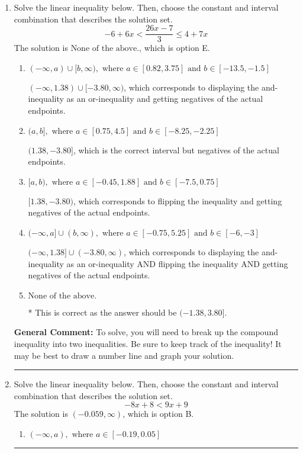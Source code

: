 \documentclass{extbook}[14pt]
\newcommand{\litem}[1]{\item #1

\rule{\textwidth}{0.4pt}}
\begin{document}
\begin{enumerate}
{\begin{enumerate}[label=\Alph*.]
 $(-\infty, -0.429)$, which corresponds to switching the direction of the interval. You likely did this if you did not flip the inequality when dividing by a negative!
\item \( \text{None of the above}. \)

You may have chosen this if you thought the inequality did not match the ends of the intervals.
\end{enumerate}

\textbf{General Comment:} Remember that less/greater than or equal to includes the endpoint, while less/greater do not. Also, remember that you need to flip the inequality when you multiply or divide by a negative.
}
\litem{
Solve the linear inequality below. Then, choose the constant and interval combination that describes the solution set.
\[ -6 + 6 x < \frac{26 x - 7}{3} \leq 4 + 7 x \]The solution is \( \text{None of the above.} \), which is option E.\begin{enumerate}[label=\Alph*.]
\item \( (-\infty, a) \cup [b, \infty), \text{ where } a \in [0.82, 3.75] \text{ and } b \in [-13.5, -1.5] \)

$(-\infty, 1.38) \cup [-3.80, \infty)$, which corresponds to displaying the and-inequality as an or-inequality and getting negatives of the actual endpoints.
\item \( (a, b], \text{ where } a \in [0.75, 4.5] \text{ and } b \in [-8.25, -2.25] \)

$(1.38, -3.80]$, which is the correct interval but negatives of the actual endpoints.
\item \( [a, b), \text{ where } a \in [-0.45, 1.88] \text{ and } b \in [-7.5, 0.75] \)

$[1.38, -3.80)$, which corresponds to flipping the inequality and getting negatives of the actual endpoints.
\item \( (-\infty, a] \cup (b, \infty), \text{ where } a \in [-0.75, 5.25] \text{ and } b \in [-6, -3] \)

$(-\infty, 1.38] \cup (-3.80, \infty)$, which corresponds to displaying the and-inequality as an or-inequality AND flipping the inequality AND getting negatives of the actual endpoints.
\item \( \text{None of the above.} \)

* This is correct as the answer should be $(-1.38, 3.80]$.
\end{enumerate}

\textbf{General Comment:} To solve, you will need to break up the compound inequality into two inequalities. Be sure to keep track of the inequality! It may be best to draw a number line and graph your solution.
}
\litem{
Solve the linear inequality below. Then, choose the constant and interval combination that describes the solution set.
\[ -8x + 8 < 9x + 9 \]The solution is \( (-0.059, \infty) \), which is option B.\begin{enumerate}[label=\Alph*.]
\item \( (-\infty, a), \text{ where } a \in [-0.19, 0.05] \)


\end{enumerate}}
\end{enumerate}
\end{document}
